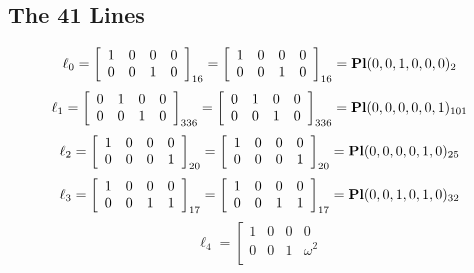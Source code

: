 \documentclass{article}
\begin{document}
{\subsection*{The 41 Lines}
$$
\ell_{0} = 
\left[
\begin{array}{*{4}{r}}
1 & 0 & 0 & 0\\
0 & 0 & 1 & 0\\
\end{array}
\right]
_{16}
=
\left[
\begin{array}{*{4}c}
1  & 0  & 0  & 0\\
0  & 0  & 1  & 0\\
\end{array}
\right]_{16}
={\rm\bf Pl}(0,0,1,0,0,0 )_{2}$$
$$
\ell_{1} = 
\left[
\begin{array}{*{4}{r}}
0 & 1 & 0 & 0\\
0 & 0 & 1 & 0\\
\end{array}
\right]
_{336}
=
\left[
\begin{array}{*{4}c}
0  & 1  & 0  & 0\\
0  & 0  & 1  & 0\\
\end{array}
\right]_{336}
={\rm\bf Pl}(0,0,0,0,0,1 )_{101}$$
$$
\ell_{2} = 
\left[
\begin{array}{*{4}{r}}
1 & 0 & 0 & 0\\
0 & 0 & 0 & 1\\
\end{array}
\right]
_{20}
=
\left[
\begin{array}{*{4}c}
1  & 0  & 0  & 0\\
0  & 0  & 0  & 1\\
\end{array}
\right]_{20}
={\rm\bf Pl}(0,0,0,0,1,0 )_{25}$$
$$
\ell_{3} = 
\left[
\begin{array}{*{4}{r}}
1 & 0 & 0 & 0\\
0 & 0 & 1 & 1\\
\end{array}
\right]
_{17}
=
\left[
\begin{array}{*{4}c}
1  & 0  & 0  & 0\\
0  & 0  & 1  & 1\\
\end{array}
\right]_{17}
={\rm\bf Pl}(0,0,1,0,1,0 )_{32}$$
$$
\ell_{4} = 
\left[
\begin{array}{*{4}{r}}
1 & 0 & 0 & 0\\
0 & 0 & 1 & \omega^{2}\\
\end{array}
$$}
\end{document}
